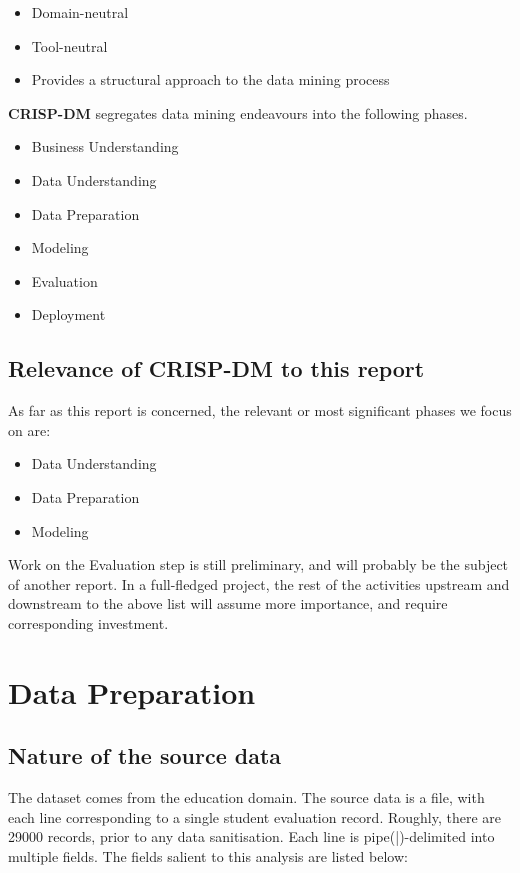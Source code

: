 \documentclass[10pt]{article}
\begin{document}
\begin{itemize}
\item Domain-neutral
\item Tool-neutral
\item Provides a structural approach to the data mining process
\end{itemize}

\textbf{CRISP-DM} segregates data mining endeavours into the following phases.

\begin{itemize}
\item Business Understanding
\item Data Understanding
\item Data Preparation
\item Modeling
\item Evaluation
\item Deployment
\end{itemize}

\subsection{Relevance of CRISP-DM to this report}
As far as this report is concerned, the relevant or most significant phases we focus on are:
\begin{itemize}
\item Data Understanding
\item Data Preparation
\item Modeling
\end{itemize}

Work on the Evaluation step is still preliminary, and will probably be the subject of another report. In a full-fledged project, the rest of the activities upstream and downstream to the above list will assume more importance, and require corresponding investment.

\newpage
\section{Data Preparation}
\subsection{Nature of the source data}
The dataset comes from the education domain. The source data is a file, with each line corresponding to a single student evaluation record. Roughly, there are 29000 records, prior to any data sanitisation. Each line is pipe(|)-delimited into multiple fields. The fields salient to this analysis are listed below:
\end{document}

